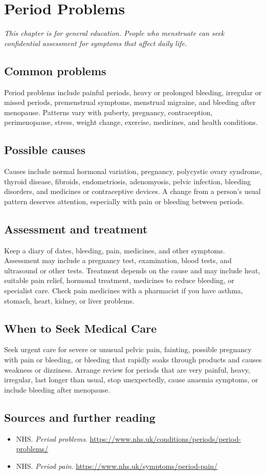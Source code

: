 \chapter{Period Problems}

\medskip
\noindent\textit{This chapter is for general education. People who menstruate can seek confidential assessment for symptoms that affect daily life.}

\section*{Common problems}
Period problems include painful periods, heavy or prolonged bleeding, irregular or missed periods, premenstrual symptoms, menstrual migraine, and bleeding after menopause. Patterns vary with puberty, pregnancy, contraception, perimenopause, stress, weight change, exercise, medicines, and health conditions.

\section*{Possible causes}
Causes include normal hormonal variation, pregnancy, polycystic ovary syndrome, thyroid disease, fibroids, endometriosis, adenomyosis, pelvic infection, bleeding disorders, and medicines or contraceptive devices. A change from a person’s usual pattern deserves attention, especially with pain or bleeding between periods.

\section*{Assessment and treatment}
Keep a diary of dates, bleeding, pain, medicines, and other symptoms. Assessment may include a pregnancy test, examination, blood tests, and ultrasound or other tests. Treatment depends on the cause and may include heat, suitable pain relief, hormonal treatment, medicines to reduce bleeding, or specialist care. Check pain medicines with a pharmacist if you have asthma, stomach, heart, kidney, or liver problems.

\section*{When to Seek Medical Care}
Seek urgent care for severe or unusual pelvic pain, fainting, possible pregnancy with pain or bleeding, or bleeding that rapidly soaks through products and causes weakness or dizziness. Arrange review for periods that are very painful, heavy, irregular, last longer than usual, stop unexpectedly, cause anaemia symptoms, or include bleeding after menopause.

\section*{Sources and further reading}
\begin{itemize}
\item NHS. \textit{Period problems}. \url{https://www.nhs.uk/conditions/periods/period-problems/}
\item NHS. \textit{Period pain}. \url{https://www.nhs.uk/symptoms/period-pain/}
\end{itemize}
